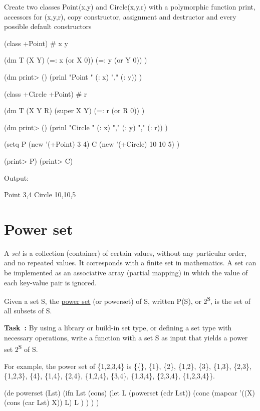 Create two classes Point(x,y) and Circle(x,y,r) with a polymorphic
function print, accessors for (x,y,r), copy constructor, assignment and
destructor and every possible default constructors

\begin{wideverbatim}

(class +Point)
# x y

(dm T (X Y)
   (=: x (or X 0))
   (=: y (or Y 0)) )

(dm print> ()
   (prinl "Point " (: x) "," (: y)) )

(class +Circle +Point)
# r

(dm T (X Y R)
   (super X Y)
   (=: r (or R 0)) )

(dm print> ()
   (prinl "Circle " (: x) "," (: y) "," (: r)) )


(setq
   P (new '(+Point) 3 4)
   C (new '(+Circle) 10 10 5) )

(print> P)
(print> C)

Output:

Point 3,4
Circle 10,10,5

\end{wideverbatim}

\pagebreak{}
\section*{Power set}

A \emph{set} is a collection (container) of certain values,
without any particular order, and no repeated values. It corresponds
with a finite set in mathematics. A set can be implemented as an
associative array (partial mapping) in which the value of each key-value
pair is ignored.

Given a set S, the \href{http://en.wikipedia.org/wiki/Power\_set}{power
set} (or powerset) of S, written P(S), or 2\textsuperscript{S}, is the
set of all subsets of S.

\textbf{Task~:} By using a library or build-in set type, or defining a
set type with necessary operations, write a function with a set S as
input that yields a power set 2\textsuperscript{S} of S.

For example, the power set of \{1,2,3,4\} is \{\{\}, \{1\}, \{2\},
\{1,2\}, \{3\}, \{1,3\}, \{2,3\}, \{1,2,3\}, \{4\}, \{1,4\}, \{2,4\},
\{1,2,4\}, \{3,4\}, \{1,3,4\}, \{2,3,4\}, \{1,2,3,4\}\}.


\begin{wideverbatim}

(de powerset (Lst)
   (ifn Lst
      (cons)
      (let L (powerset (cdr Lst))
         (conc
            (mapcar '((X) (cons (car Lst) X)) L)
            L ) ) ) )

\end{wideverbatim}

